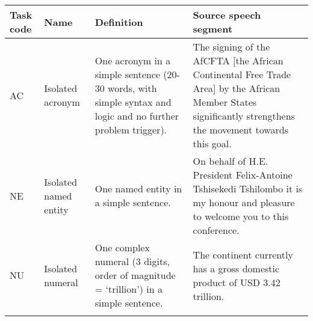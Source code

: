 \begin{sidewaystable}
\small
\begin{tabularx}{\textwidth}{l>{\raggedright\arraybackslash}p{}QQ}
\lsptoprule
{Task code} & {Name}    & {Definition}   & {Source speech segment}       \\ 
\midrule
AC                 & Isolated acronym                                                                                               & One acronym in a simple sentence (20-30 words, with simple syntax and logic and no further problem trigger).                                                                                                                                                                                                                                                                                                   & The signing of the AfCFTA {[}the African Continental Free Trade Area{]} by the African Member States   significantly strengthens the movement towards this goal.                                                                                                              \\ \tablevspace
NE                 & Isolated named entity                                               & One named entity in a simple sentence.                                                                                                                                                                                                                                                                                                                                                                                                                      & On behalf of H.E. President Felix-Antoine Tshisekedi Tshilombo it is my honour and pleasure to welcome you to this conference.                                                                                                                                                  \\ \tablevspace
NU                 & Isolated numeral                                                                                               & One complex numeral (3 digits, order of magnitude = ‘trillion’) in a simple sentence.                                                                                                                                                                                                                                                                                                                             & The continent currently has a gross domestic product of USD 3.42 trillion.                                                                                                                                                                                                        \\ \tablevspace

\end{tabularx}
\end{sidewaystable}
